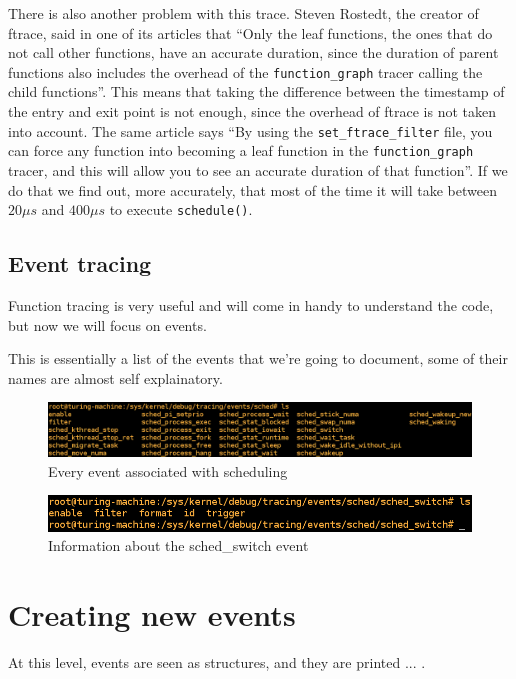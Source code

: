 \documentclass[10pt]{book}
\begin{document}
There is also another problem with this trace. Steven Rostedt, the creator of ftrace, said in one of its articles that ``Only the leaf functions, the ones that do not call other functions, have an accurate duration, since the duration of parent functions also includes the overhead of the \verb|function_graph| tracer calling the child functions''.\cite{secrets} This means that taking the difference between the timestamp of the entry and exit point is not enough, since the overhead of ftrace is not taken into account. The same article says ``By using the \verb|set_ftrace_filter| file, you can force any function into becoming a leaf function in the \verb|function_graph| tracer, and this will allow you to see an accurate duration of that function''. If we do that we find out, more accurately, that most of the time it will take between $20 \mu s$ and $400\mu s$ to execute \verb|schedule()|.

\subsection{Event tracing}
Function tracing is very useful and will come in handy to understand the code, but now we will focus on events. 

This is essentially a list of the events that we're going to document, some of their names are almost self explainatory.
\begin{figure}[ht]
\includegraphics[width=\textwidth]{images/shell_sched.png}
\caption{Every event associated with scheduling}
\label{img:sched}
\end{figure}

\begin{figure}[ht]
\includegraphics[width=\textwidth]{images/shell_sched_event.png} 
\caption{Information about the sched\_switch event}
\label{img:sched_event}
\end{figure}
\section{Creating new events}

At this level, events are seen as structures, and they are printed ... .
\end{document}
